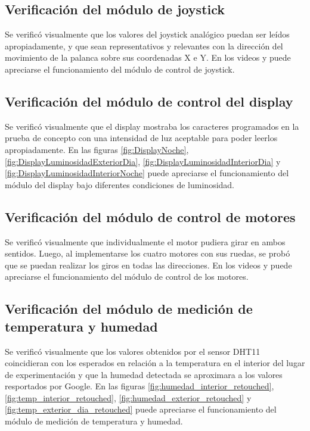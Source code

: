 \subsection{Verificación del módulo de joystick}
Se verificó visualmente que los valores del joystick analógico puedan ser leídos apropiadamente, y que sean representativos y relevantes con la dirección del movimiento de la palanca sobre sus coordenadas X e Y. En los videos \cite{Prototipado_Ensamblado_1} y \cite{Prototipado_Ensamblado_2} puede apreciarse el funcionamiento del módulo de control de joystick.



\subsection{Verificación del módulo de control del display}
Se verificó visualmente que el display mostraba los caracteres programados en la prueba de concepto con una intensidad de luz aceptable para poder leerlos apropiadamente. En las figuras \ref{fig:DisplayNoche}, \ref{fig:DisplayLuminosidadExteriorDia}, \ref{fig:DisplayLuminosidadInteriorDia} y \ref{fig:DisplayLuminosidadInteriorNoche} puede apreciarse el funcionamiento del módulo del display bajo diferentes condiciones de luminosidad.


\subsection{Verificación del módulo de control de motores}
Se verificó visualmente que individualmente el motor pudiera girar en ambos sentidos. Luego, al implementarse los cuatro motores con sus ruedas, se probó que se puedan realizar los giros en todas las direcciones. En los videos \cite{Prototipado_Ensamblado_1} y \cite{Prototipado_Ensamblado_2} puede apreciarse el funcionamiento del módulo de control de los motores.

\subsection{Verificación del módulo de medición de temperatura y humedad}
Se verificó visualmente que los valores obtenidos por el sensor DHT11 coincidieran con los esperados en relación a la temperatura en el interior del lugar de experimentación y que la humedad detectada se aproximara a los valores resportados por Google. En las figuras \ref{fig:humedad_interior_retouched}, \ref{fig:temp_interior_retouched}, \ref{fig:humedad_exterior_retouched} y \ref{fig:temp_exterior_dia_retouched} puede apreciarse el funcionamiento del módulo de medición de temperatura y humedad.

